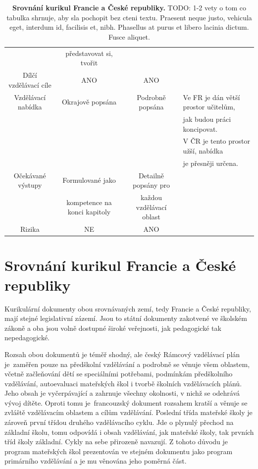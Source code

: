 \begin{landscape}
\begin{table}[t]
\begin{tabular}{|c|c|c|l|}
\rowcolor{grey!10}
					& představovat si, tvořit 	&						& 	\\		
\rowcolor{grey!50}
Dílčí vzdělávací cíle	& ANO					& ANO 					& 	\\	
\rowcolor{grey!10}
Vzdělávací nabídka	& Okrajově popsána	 		& Podrobně popsána	 	& Ve FR je dán větší prostor učitelům, 	\\
\rowcolor{grey!10}
					&							&						& jak budou práci koncipovat. 			\\
\rowcolor{grey!10}
					&							&						& V ČR je tento prostor užší, nabídka 	\\
\rowcolor{grey!10}
					&							&						& je přesněji určena. 					\\
\rowcolor{grey!50}
Očekávané výstupy	& Formulované jako 				& Detailně popsány pro 		& 		\\ 
\rowcolor{grey!50}
					& kompetence na konci kapitoly 	& každou vzdělávací oblast 	& 		\\
\rowcolor{grey!10}
Rizika	 			& NE						& ANO	 						& 		\\
\hline
\end{tabular}
\caption{ \textbf{Srovnání kurikul Francie a České republiky.}
	TODO: 1-2 vety o tom co tabulka shrnuje, aby sla pochopit bez cteni textu. Praesent neque justo, vehicula eget, interdum id, facilisis et, nibh. Phasellus at purus et libero lacinia dictum. Fusce aliquet.
}
\label{tab:srovnaniKurikul}
\end{table}
\end{landscape}

\section{Srovnání kurikul Francie a České republiky}
	Kurikulární dokumenty obou srovnávaných zemí, tedy Francie a České republiky, mají stejné legislativní zázemí. Jsou to státní dokumenty zakotvené ve školském zákoně a oba jsou volně dostupné široké veřejnosti, jak pedagogické tak nepedagogické. 

	Rozsah obou dokumentů je téměř shodný, ale český Rámcový vzdělávací plán je zaměřen pouze na předškolní vzdělávání a podrobně se věnuje všem oblastem, včetně začleňování dětí se speciálními potřebami, podmínkám předškolního vzdělávání, autoevaluaci mateřských škol i tvorbě školních vzdělávacích plánů. Jeho obsah je vyčerpávající a zahrnuje všechny okolnosti, v nichž se odehrává vývoj dítěte. Oproti tomu je francouzský dokument rozsahem kratší a věnuje se zvláště vzdělávacím oblastem a cílům vzdělávání. Poslední třída mateřské školy je zároveň první třídou druhého vzdělávacího cyklu. Jde o plynulý přechod na základní školu, tomu odpovídá i obsah vzdělávání, jak mateřské školy, tak prvních tříd školy základní. Cykly na sebe přirozeně navazují. Z tohoto důvodu je program mateřských škol prezentován ve stejném dokumentu jako program primárního vzdělávání a je mu věnována jeho poměrná část.

